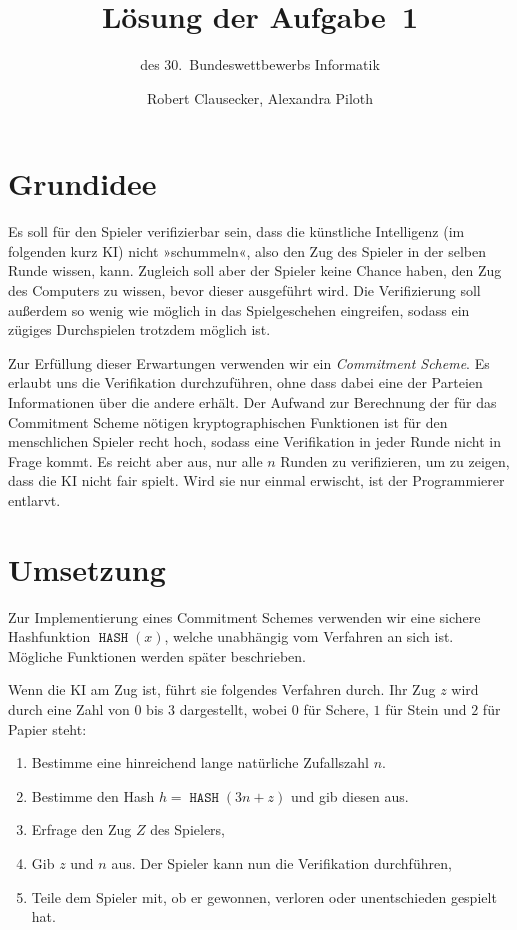 \documentclass{scrartcl}
\title{Lösung der Aufgabe~1}
\subtitle{des 30.~Bundeswettbewerbs Informatik}
\author{Robert Clausecker, Alexandra Piloth}
\DeclareMathOperator{\hash}{\texttt{HASH}}
\begin{document}
\maketitle

\section{Grundidee}
Es soll für den Spieler verifizierbar sein, dass die künstliche Intelligenz (im
folgenden kurz KI) nicht »schummeln«, also den Zug des Spieler in der selben
Runde wissen, kann.  Zugleich soll aber der Spieler keine Chance haben, den Zug
des Computers zu wissen, bevor dieser ausgeführt wird.  Die Verifizierung soll
außerdem so wenig wie möglich in das Spielgeschehen eingreifen, sodass ein
zügiges Durchspielen trotzdem möglich ist.

Zur Erfüllung dieser Erwartungen verwenden wir ein \emph{Commitment Scheme}.  Es
erlaubt uns die Verifikation durchzuführen, ohne dass dabei eine der Parteien
Informationen über die andere erhält.  Der Aufwand zur Berechnung der für das
Commitment Scheme nötigen kryptographischen Funktionen ist für den menschlichen
Spieler recht hoch, sodass eine Verifikation in jeder Runde nicht in Frage
kommt.  Es reicht aber aus, nur alle $n$ Runden zu verifizieren, um zu zeigen,
dass die KI nicht fair spielt. Wird sie nur einmal erwischt, ist der
Programmierer entlarvt.

\section{Umsetzung}
Zur Implementierung eines Commitment Schemes verwenden wir eine sichere
Hashfunktion $\hash(x)$, welche unabhängig vom Verfahren an sich ist.  Mögliche
Funktionen werden später beschrieben.

Wenn die KI am Zug ist, führt sie folgendes Verfahren durch. Ihr Zug $z$ wird
durch eine Zahl von $0$ bis $3$ dargestellt, wobei $0$ für Schere, $1$ für Stein
und $2$ für Papier steht:
\begin{enumerate}
\item Bestimme eine hinreichend lange natürliche Zufallszahl $n$.
\item Bestimme den Hash $h = \hash(3n+z)$ und gib diesen aus.
\item Erfrage den Zug $Z$ des Spielers,
\item Gib $z$ und $n$ aus. Der Spieler kann nun die Verifikation durchführen,
\item Teile dem Spieler mit, ob er gewonnen, verloren oder unentschieden
  gespielt hat.
\end{enumerate}
\end{document}
